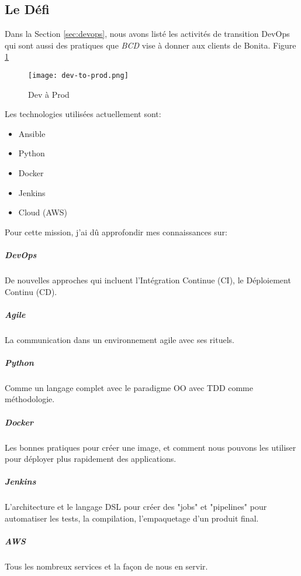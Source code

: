 \subsection{Le Défi}
Dans la Section \ref{sec:devops}, nous avons listé les activités de transition DevOps qui sont aussi des pratiques que \emph{BCD} vise à donner aux clients de Bonita. Figure \ref{fig:dev-to-prod}

\begin{figure}[!ht]
\centering
\texttt{[image: dev-to-prod.png]}
\caption{Dev à Prod}
\label{fig:dev-to-prod}
\end{figure}

Les technologies utilisées actuellement sont:
\begin{itemize}
  \item Ansible
  \item Python
  \item Docker
  \item Jenkins
  \item Cloud (AWS)
\end{itemize}

Pour cette mission, j'ai dû approfondir mes connaissances sur:
\subparagraph{DevOps} De nouvelles approches qui incluent l'Intégration Continue (CI), le Déploiement Continu (CD).
\subparagraph{Agile} La communication dans un environnement agile avec ses rituels.
\subparagraph{Python} Comme un langage complet avec le paradigme OO avec TDD comme méthodologie.
\subparagraph{Docker} Les bonnes pratiques pour créer une image, et comment nous pouvons les utiliser pour déployer plus rapidement des applications.
\subparagraph{Jenkins} L’architecture et le langage DSL pour  créer des "jobs" et "pipelines" pour automatiser les tests, la compilation, l’empaquetage d'un produit final.
\subparagraph{AWS} Tous les nombreux services et la façon de nous en servir.
